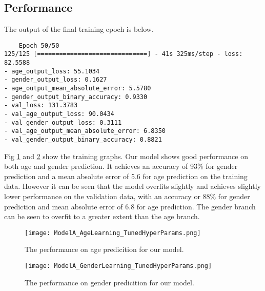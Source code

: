 \subsection{Performance}
The output of the final training epoch is below.

\begin{verbatim}
    Epoch 50/50
125/125 [==============================] - 41s 325ms/step - loss: 82.5588 
- age_output_loss: 55.1034 
- gender_output_loss: 0.1627 
- age_output_mean_absolute_error: 5.5780 
- gender_output_binary_accuracy: 0.9330 
- val_loss: 131.3783 
- val_age_output_loss: 90.0434 
- val_gender_output_loss: 0.3111 
- val_age_output_mean_absolute_error: 6.8350 
- val_gender_output_binary_accuracy: 0.8821
\end{verbatim}

Fig \ref{fig:ModelAPerformanceAge} and \ref{fig:ModelAPerformanceGender}
show the training graphs. Our model shows good performance on both age and gender prediction. It achieves an accuracy
of 93\% for gender prediction and a mean absolute error of 5.6 for age prediction on the training data. 
However it can be seen that the model overfits slightly and achieves slightly lower performance on the validation
data, with an accuracy or 88\% for gender prediction and mean absolute error of 6.8 for age prediction. The gender 
branch can be seen to overfit to a greater extent than the age branch.




\begin{figure}
    \centering
    \texttt{[image: ModelA\_AgeLearning\_TunedHyperParams.png]}
    \caption{\label{fig:ModelAPerformanceAge} The performance on age predicition for our model.}
\end{figure}


\begin{figure}
    \centering
    \texttt{[image: ModelA\_GenderLearning\_TunedHyperParams.png]}
    \caption{\label{fig:ModelAPerformanceGender} The performance on gender predicition for our model.}
\end{figure}

